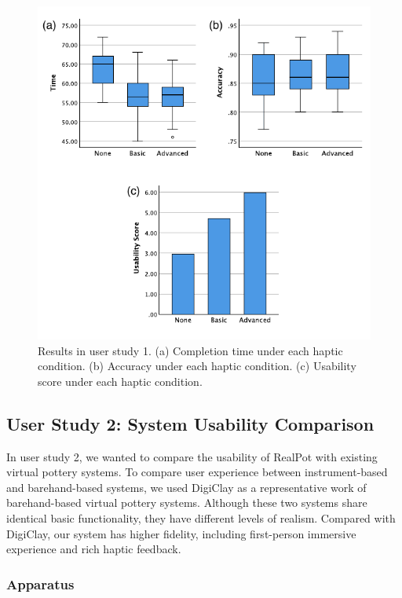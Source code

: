 \documentclass{svjour3}                     %
\begin{document}
\begin{figure}
	\includegraphics[width=\textwidth]{fig12.pdf}
	\caption{Results in user study 1. (a) Completion time under each haptic condition. (b) Accuracy under each haptic condition. (c) Usability score under each haptic condition.}
	\label{fig:r1}
\end{figure}



\subsection{User Study 2: System Usability Comparison}

In user study 2, we wanted to compare the usability of RealPot with existing virtual pottery systems.
%
To compare user experience between instrument-based and barehand-based systems, we used DigiClay \cite{gao2018digiclay} as a representative work of barehand-based virtual pottery systems.
Although these two systems share identical basic functionality, they have different levels of realism.
Compared with DigiClay, our system has higher fidelity, including first-person immersive experience and rich haptic feedback.
\subsubsection{Apparatus}
\end{document}
